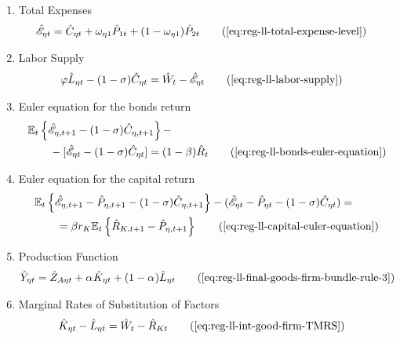 \documentclass[../thesis.tex]{subfiles}
\begin{document}
{\begin{itemize}
\begin{enumerate}
		\item Total Expenses
		\begin{align}
			\hat{\mathscr{E}}_{\eta t} &= \hat{C}_{\eta t} + \omega_{\eta 1} \hat{P}_{1 t} + (1 -\omega_{\eta 1}) \hat{P}_{2 t} \tag{\ref{eq:reg-ll-total-expense-level}}
		\end{align}

		\item Labor Supply
		\begin{alignat}{2}
			\varphi \hat{L}_{\eta t} - (1 -\sigma) \hat{C}_{\eta t} &= \hat{W}_t - \hat{ \mathscr{E} }_{\eta t} \tag{\ref{eq:reg-ll-labor-supply}}
		\end{alignat}
		
		\item Euler equation for the bonds return
		\begin{alignat}{2}
			& \E \left\{ \hat{\mathscr{E}}_{\eta, t+1} - (1 -\sigma)\hat{C}_{\eta, t+1} \right\} - \nonumber \\ & \qquad - [\hat{\mathscr{E}}_{\eta t} - (1 -\sigma)\hat{C}_{\eta t}] = (1 -\beta) \hat{R}_{t} \tag{\ref{eq:reg-ll-bonds-euler-equation}}
		\end{alignat}
		
		\item Euler equation for the capital return
		\begin{alignat}{2}
			& \E \left\{ \hat{\mathscr{E}}_{\eta, t+1} - \hat{P}_{\eta, t+1}  - (1 -\sigma) \hat{C}_{\eta, t+1} \right\} - (\hat{\mathscr{E}}_{\eta t} - \hat{P}_{\eta t} - (1 -\sigma) \hat{C}_{\eta t}) = \nonumber \\
			& \qquad = \beta r_{K} \mathbb{E}_t \left\{ \hat{R}_{K, t+1} - \hat{P}_{\eta, t+1} \right\} \tag{\ref{eq:reg-ll-capital-euler-equation}}
		\end{alignat}
		
		\item Production Function
		\begin{align}
			\hat{Y}_{\eta t} &= \hat{Z}_{A\eta t} + {\alpha_{}} \hat{K}_{\eta t} + (1-{\alpha_{}}) \hat{L}_{\eta t} \tag{\ref{eq:reg-ll-final-goods-firm-bundle-rule-3}}
		\end{align}
		
		\item Marginal Rates of Substitution of Factors
		\begin{align}
			\hat{K}_{\eta t} - \hat{L}_{\eta t} &= \hat{W}_{t} - \hat{R}_{K t} \tag{\ref{eq:reg-ll-int-good-firm-TMRS}}
		\end{align}
		

\end{enumerate}
\end{itemize}}
\end{document}
